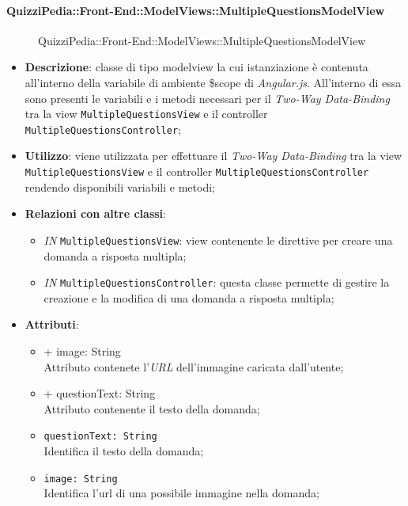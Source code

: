 \paragraph{QuizziPedia::Front-End::ModelViews::MultipleQuestionsModelView}
\begin{figure} [ht]
	\centering
	\caption{QuizziPedia::Front-End::ModelViews::MultipleQuestionsModelView}
\end{figure} \FloatBarrier
\begin{itemize}
	\item \textbf{Descrizione}: classe di tipo modelview la cui istanziazione è contenuta all'interno della variabile di ambiente \$scope di \textit{Angular.js}. All'interno di essa sono presenti le variabili e i metodi necessari per il \textit{Two-Way Data-Binding} tra la view \texttt{MultipleQuestionsView} e il controller \texttt{MultipleQuestionsController}; 
	\item \textbf{Utilizzo}: viene utilizzata per effettuare il \textit{Two-Way Data-Binding} tra la view \texttt{MultipleQuestionsView} e il controller \texttt{MultipleQuestionsController} rendendo disponibili variabili e metodi;
	\item \textbf{Relazioni con altre classi}:
	\begin{itemize}
		\item \textit{IN} \texttt{MultipleQuestionsView}: view contenente le direttive per creare una domanda a risposta multipla; 
		\item \textit{IN} \texttt{MultipleQuestionsController}: questa classe permette di gestire la creazione e la modifica di una domanda a risposta multipla;
	\end{itemize}
	\item \textbf{Attributi}:
	\begin{itemize}
		\item {+ image: String} \\ Attributo contenete l'\textit{URL} dell'immagine caricata dall'utente;
		\item {+ questionText: String} \\ Attributo contenente il testo della domanda;
		\item \texttt{questionText: String} \\ Identifica il testo della domanda;
		\item \texttt{image: String} \\ Identifica l'url di una possibile immagine nella domanda;

\end{itemize}
\end{itemize}
